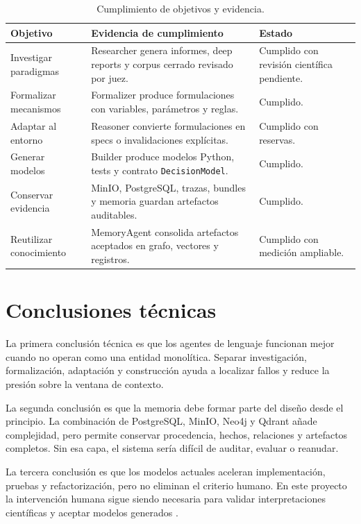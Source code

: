 \begin{table}[H]
\begin{center}
\small
\begin{tabular}{|p{3.0cm}|p{6.2cm}|p{3.1cm}|} \hline
\textbf{Objetivo} & \textbf{Evidencia de cumplimiento} & \textbf{Estado} \\ \hline
Investigar paradigmas & Researcher genera informes, deep reports y corpus cerrado revisado por juez. & Cumplido con revisión científica pendiente. \\ \hline
Formalizar mecanismos & Formalizer produce formulaciones con variables, parámetros y reglas. & Cumplido. \\ \hline
Adaptar al entorno & Reasoner convierte formulaciones en specs o invalidaciones explícitas. & Cumplido con reservas. \\ \hline
Generar modelos & Builder produce modelos Python, tests y contrato \texttt{DecisionModel}. & Cumplido. \\ \hline
Conservar evidencia & MinIO, PostgreSQL, trazas, bundles y memoria guardan artefactos auditables. & Cumplido. \\ \hline
Reutilizar conocimiento & MemoryAgent consolida artefactos aceptados en grafo, vectores y registros. & Cumplido con medición ampliable. \\ \hline
\end{tabular}
\caption{Cumplimiento de objetivos y evidencia.}
\end{center}
\end{table}

\section{Conclusiones técnicas}

La primera conclusión técnica es que los agentes de lenguaje funcionan mejor
cuando no operan como una entidad monolítica. Separar investigación,
formalización, adaptación y construcción ayuda a localizar fallos y reduce la
presión sobre la ventana de contexto.

La segunda conclusión es que la memoria debe formar parte del diseño desde el
principio. La combinación de PostgreSQL, MinIO, Neo4j y Qdrant añade
complejidad, pero permite conservar procedencia, hechos, relaciones y artefactos
completos. Sin esa capa, el sistema sería difícil de auditar, evaluar o
reanudar.

La tercera conclusión es que los modelos actuales aceleran implementación,
pruebas y refactorización, pero no eliminan el criterio humano. En este proyecto
la intervención humana sigue siendo necesaria para validar interpretaciones
científicas y aceptar modelos generados \cite{chen2021codex,yang2024sweagent}.

